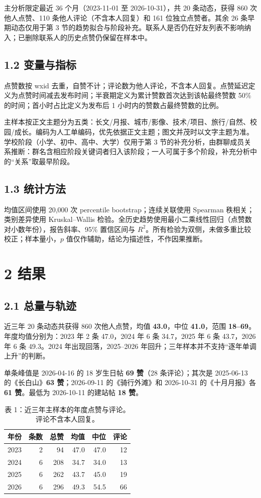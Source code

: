 主分析限定最近 36 个月（2023-11-01 至 2026-10-31），共 20 条动态，获得 860 次他人点赞、110 条他人评论（不含本人回复）和 161 位独立点赞者。其余 26 条早期动态仅用于第 3 节的趋势拟合与阶段补充。联系人是否仍在好友列表不影响纳入；已删除联系人的历史点赞仍保留在样本中。

\subsection{1.2 变量与指标}
点赞数按 wxid 去重，自赞不计；评论数为他人评论，不含本人回复。点赞延迟定义为点赞时间减去发布时间；半衰期定义为累计赞数首次达到该帖最终赞数 50\% 的时间；首小时占比定义为发布后 1 小时内的赞数占最终赞数的比例。

主样本按正文主题分为五类：长文/月报、城市/影像、技术/项目、旅行/自然、校园/成长。编码为人工单编码，优先依据正文主题；图文并茂时以文字主题为准。学校阶段（小学、初中、高中、大学）仅用于第 3 节的补充分析，由群聊成员关系推断：群名含相应阶段关键词者归入该阶段；一人可属于多个阶段，补充分析中的“关系”取最早阶段。

\subsection{1.3 统计方法}
均值区间使用 20,000 次 percentile bootstrap；连续关联使用 Spearman 秩相关；类别差异使用 Kruskal--Wallis 检验。全历史趋势使用最小二乘线性回归（点赞数对小数年份），报告斜率、95\% 置信区间与 $R^2$。所有检验为双侧，未做多重比较校正；样本量小，$p$ 值仅作辅助，结论为描述性，不作因果推断。

\section{2 结果}

\subsection{2.1 总量与轨迹}
近三年 20 条动态共获得 860 次他人点赞，均值 \textbf{43.0}，中位 \textbf{41.0}，范围 \textbf{18--69}。年度均值分别为：2023 年 2 条 47.0，2024 年 6 条 34.7，2025 年 6 条 43.7，2026 年 6 条 49.3。2024 年出现回落，2025--2026 年回升；三年样本并不支持“逐年单调上升”的判断。

单条峰值是 2026-04-16 的 18 岁生日帖 \textbf{69 赞}（28 条评论）；其次是 2025-06-13 的《长白山》\textbf{63 赞}；2026-09-11 的《骑行外滩》和 2026-10-31 的《十月月报》各 \textbf{61 赞}。最低为 2026-10-11 的建站帖 \textbf{18 赞}。

\begin{table}[H]
\centering
\caption{表 1：近三年主样本的年度点赞与评论。评论不含本人回复。}
\footnotesize
\begin{tabular}{@{}l r r r r r@{}}
\toprule
年份 & 条数 & 总赞 & 均值 & 中位 & 评论 \\
\midrule
2023 & 2 & 94 & 47.0 & 47.0 & 12 \\
2024 & 6 & 208 & 34.7 & 34.0 & 13 \\
2025 & 6 & 262 & 43.7 & 45.0 & 19 \\
2026 & 6 & 296 & 49.3 & 54.5 & 66 \\
\bottomrule
\end{tabular}
\end{table}

